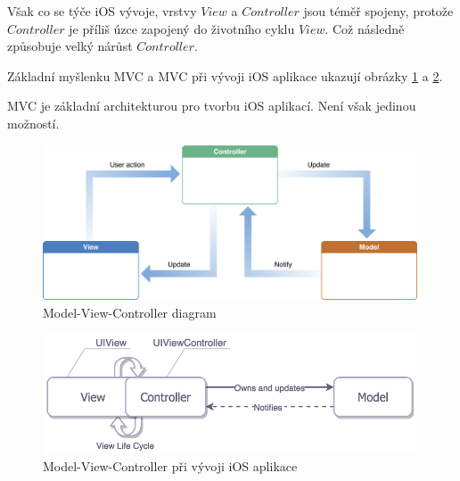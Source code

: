 \documentclass[thesis=M,czech]{FITthesis}[2012/06/26]
\begin{document}
Však co se týče iOS vývoje, vrstvy $View$ a $Controller$ jsou téměř spojeny, protože $Controller$ je příliš úzce zapojený do životního cyklu $View$. Což následně způsobuje velký nárůst $Controller$.\cite{Orlov}

Základní myšlenku MVC a MVC při vývoji iOS aplikace ukazují obrázky \ref{fig:mvc} a \ref{fig:mvc-apple}.

MVC je základní architekturou pro tvorbu iOS aplikací. Není však jedinou možností.

\begin{figure}[h]\centering
 \includegraphics[width=0.99\textwidth]{./pictures/architektury/model_view_controller}
 \caption[Model-View-Controller diagram]{Model-View-Controller diagram \cite{mvc-pic}}\label{fig:mvc}
\end{figure}

\begin{figure}[h]\centering
 \includegraphics[width=0.99\textwidth]{./pictures/architektury/appleMVC}
 \caption[Model-View-Controller při vývoji iOS aplikace]{Model-View-Controller při vývoji iOS aplikace \cite{mvc-apple-pic}}\label{fig:mvc-apple}
\end{figure}
\end{document}
